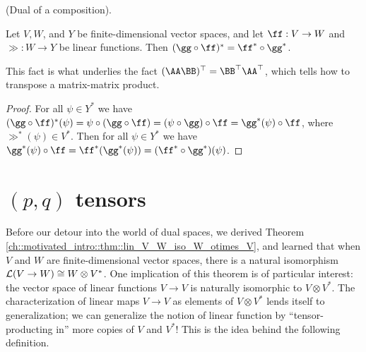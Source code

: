 \begin{theorem}
     (Dual of a composition).
     
     Let $V, W$, and $Y$ be finite-dimensional vector spaces, and let $\ff:V \rightarrow W$ and $\gg:W \rightarrow Y$ be linear functions. Then $(\gg \circ \ff)^* = \ff^* \circ \gg^*$. 
     
     This fact is what underlies the fact $(\AA \BB)^\top = \BB^\top \AA^\top$, which tells how to transpose a matrix-matrix product.
\end{theorem}

\begin{proof}
    For all $\psi \in Y^*$ we have $(\gg \circ \ff)^*(\psi) = \psi \circ (\gg \circ \ff) = (\psi \circ \gg) \circ \ff = \gg^*(\psi) \circ \ff$, where $\gg^*(\psi) \in V^*$. Then for all $\psi \in Y^*$ we have $\gg^*(\psi) \circ \ff = \ff^*(\gg^*(\psi)) = (\ff^* \circ \gg^*)(\psi)$.
\end{proof}

\newpage

\section{$(p, q)$ tensors}

Before our detour into the world of dual spaces, we derived Theorem \ref{ch::motivated_intro::thm::lin_V_W_iso_W_otimes_V}, and learned that when $V$ and $W$ are finite-dimensional vector spaces, there is a natural isomorphism $\mathcal{L}(V \rightarrow W) \cong W \otimes V^*$. One implication of this theorem is of particular interest: the vector space of linear functions $V \rightarrow V$ is naturally isomorphic to $V \otimes V^*$. The characterization of linear maps $V \rightarrow V$ as elements of $V \otimes V^*$ lends itself to generalization; we can generalize the notion of linear function by ``tensor-producting in'' more copies of $V$ and $V^*$! This is the idea behind the following definition.


